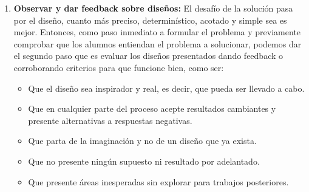 \begin{enumerate}
 \item \textbf{Observar y dar feedback sobre dise\~nos:}
 El desaf\'io de la soluci\'on pasa por el dise\~no, cuanto m\'as preciso, determin\'istico, acotado y simple sea es mejor. Entonces, como paso inmediato a 
 formular el problema y previamente comprobar que los alumnos entiendan el problema a solucionar, podemos dar el segundo paso que es evaluar los dise\~nos 
 presentados dando feedback o corroborando criterios para que funcione bien, como ser:
 \begin{itemize}
  \item Que el dise\~no sea inspirador y real, es decir, que pueda ser llevado a cabo.
  \item Que en cualquier parte del proceso acepte resultados cambiantes y presente alternativas a respuestas negativas.
  \item Que parta de la imaginaci\'on y no de un dise\~no que ya exista.
  \item Que no presente ning\'un supuesto ni resultado por adelantado.
  \item Que presente \'areas inesperadas sin explorar para trabajos posteriores.
 \end{itemize}


\end{enumerate}
